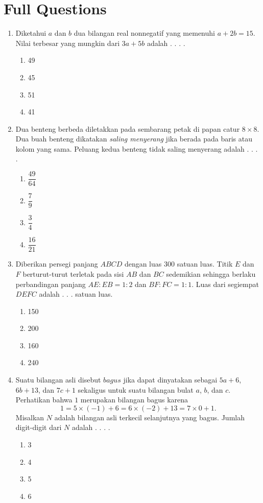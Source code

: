 \documentclass{article}
\begin{document}
\section*{Full Questions}
\begin{enumerate}
    \item Diketahui $a$ dan $b$ dua bilangan real nonnegatif yang memenuhi $a+2b=15$. Nilai terbesar yang mungkin dari $3a+5b$ adalah . . . .
    \begin{enumerate}[label={(\Alph*)}]
        \item 49 \item 45 \item 51 \item 41
    \end{enumerate}

    \item Dua benteng berbeda diletakkan pada sembarang petak di papan catur $8\times 8$. Dua buah benteng dikatakan \textit{saling menyerang} jika berada pada baris atau kolom yang sama. Peluang kedua benteng tidak saling menyerang adalah . . . .
    \begin{enumerate}[label={(\Alph*)}]
        \item $\dfrac{49}{64}$ \item $\dfrac{7}{9}$ \item $\dfrac{3}{4}$ \item $\dfrac{16}{21}$
    \end{enumerate}

    \item Diberikan persegi panjang $ABCD$ dengan luas $300$ satuan luas. Titik $E$ dan $F$ berturut-turut terletak pada sisi $AB$ dan $BC$ sedemikian sehingga berlaku perbandingan panjang $AE:EB=1:2$ dan $BF:FC=1:1$. Luas dari segiempat $DEFC$ adalah . . . satuan luas.
    \begin{enumerate}[label={(\Alph*)}]
        \item 150 \item 200 \item 160 \item 240
    \end{enumerate}

    \item Suatu bilangan asli disebut $bagus$ jika dapat dinyatakan sebagai $5a+6$, $6b+13$, dan $7c+1$ sekaligus untuk suatu bilangan bulat $a$, $b$, dan $c$. Perhatikan bahwa $1$ merupakan bilangan bagus karena
    $$1 = 5\times (-1)+6 = 6\times (-2) +13 = 7\times 0+1.$$
    Misalkan $N$ adalah bilangan asli terkecil selanjutnya yang bagus. Jumlah digit-digit dari $N$ adalah . . . .
    \begin{enumerate}[label={(\Alph*)}]
        \item 3 \item 4 \item 5 \item 6
    \end{enumerate}


\end{enumerate}
\end{document}
